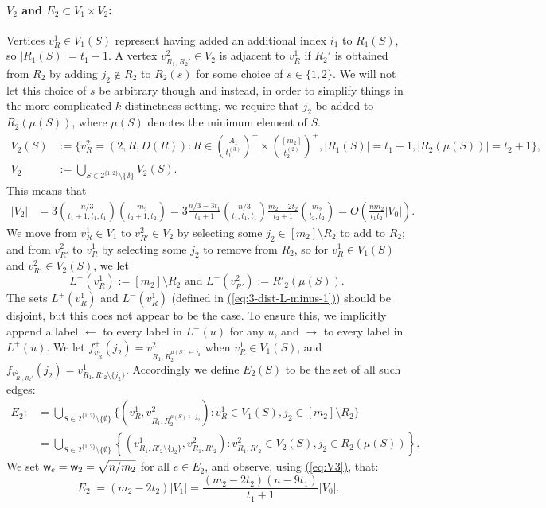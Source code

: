 \documentclass{article}
\newcommand{\eq}[1]{\hyperref[eq:#1]{(\ref*{eq:#1})}}
\renewcommand{\>}{\rangle}
\newcommand{\<}{\langle}
\renewcommand{\(}{\left(}
\renewcommand{\)}{\right)}
\def\abs#1{\left| #1 \right|}
\def\w{{\sf w}}
\begin{document}
\paragraph{$V_2$ and ${E}_2\subset V_1\times V_2$:} Vertices $v_{R}^1\in V_1(S)$ represent having added an additional index $i_1$ to $R_1(S)$, so $|R_1(S)|=t_1+1$. A vertex $v_{R_1,R_2'}^2\in V_2$ is adjacent to $v_R^1$ if $R_2'$ is obtained from $R_2$ by adding $j_2\not\in R_2$ to $R_2(s)$ for some choice of $s\in\{1,2\}$.
We will not let this choice of $s$ be arbitrary though and instead, in order to simplify things in the more complicated $k$-distinctness setting, we require that 
$j_2$ be added to $R_2(\mu(S))$, where $\mu(S)$ denotes the minimum element of $S$. 
\begin{align*}
V_2(S) &:= \Bigg\{v^2_{R}=(2,R,D(R)):R\in\binom{A_1}{t_1^{(3)}}^+\times \binom{[m_2]}{t_2^{(2)}}^+ ,
\abs{R_1(S)} = t_1+1, \abs{R_2(\mu(S))} = t_2+1 \Bigg\},\\
V_2 &:=\bigcup_{S\in 2^{\{1,2\}}\setminus\{\emptyset\}}V_2(S). \label{eq:V-2-Ss}
\end{align*}
\noindent This means that
\begin{equation}
\begin{split}
|V_2|&=3\binom{n/3}{t_1+1,t_1,t_1}\binom{m_2}{t_2+1,t_2} = 3\frac{n/3-3t_1}{t_1+1}\binom{n/3}{t_1,t_1,t_1}\frac{m_2-2t_2}{t_2+1}\binom{m_2}{t_2,t_2}
 = O\left(\frac{nm_2}{t_1t_2}|V_0|\right).
\end{split}\label{eq:V4}
\end{equation}
We move from $v^1_R\in V_1$ to $v^2_{R'}\in V_2$ by selecting some $j_2\in [m_2]\setminus R_2$ to add to $R_2$; and from $v^2_{R'}$ to $v^1_R$ by selecting some $j_2$ to remove from $R_2$, so for $v^1_R\in V_1(S)$ and $v^2_{R'}\in V_2(S)$, we let
$$L^+(v^1_{R}):= [m_2]\setminus R_2 
\mbox{ and }
L^-(v^2_{R'}):=R'_2(\mu(S)).$$
The sets $L^+(v^1_R)$ and $L^-(v^1_R)$ (defined in \eq{3-dist-L-minus-1}) should be disjoint, but this does not appear to be the case. To ensure this, we implicitly append a label $\leftarrow$ to every label in $L^-(u)$ for any $u$, and $\rightarrow$ to every label in $L^+(u)$. 
We let $f^+_{v^1_{R}}(j_2) = v_{R_1,R_2^{\mu(S) \leftarrow j_2}}^2$ when $v_R^1\in V_1(S)$, and $f^-_{v^2_{R_1,R_2'}}(j_2) = v_{R_1,R'_2 \setminus \{j_2\}}^1$. Accordingly we define $E_2(S)$ to be the set of all such edges:
\begin{align*}
	E_2:&=\bigcup_{S\in 2^{\{1,2\}}\setminus\{\emptyset\}}\{(v^1_{R},v_{R_1,R_2^{\mu(S) \leftarrow j_2}}^2):v^1_{R}\in V_1(S), j_2 \in [m_2]\setminus R_2\} \\
	&=\bigcup_{S\in 2^{\{1,2\}}\setminus\{\emptyset\}}\left\{\left(v^1_{R_1,R'_2\setminus \{j_2\}},v_{R_1,R'_2}^2\right):v^2_{R_1,R'_2}\in V_2(S), j_2 \in R_2(\mu(S))\right\}.
\end{align*}
We set $\w_e = \w_2=\sqrt{n/m_2}$ for all $e \in E_2$, and observe, using \eq{V3}, that:
\begin{equation}
|E_2|=(m_2-2t_2)|V_1|=\frac{(m_2-2t_2)(n-9t_1)}{t_1+1}|V_0|. \label{eq:E3}
\end{equation}
\end{document}
